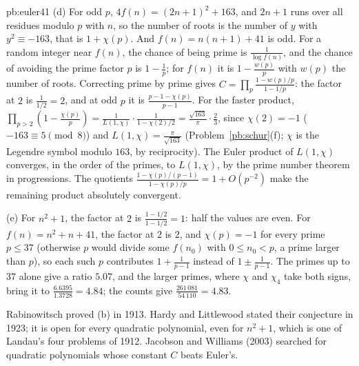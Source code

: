 \begin{solution}{pb:euler41}
(d) For odd $p$, $4f(n)=(2n+1)^2+163$, and $2n+1$ runs over all residues modulo $p$ with $n$, so the number of roots is the number of $y$ with $y^2\equiv-163$, that is $1+\chi(p)$. And
$f(n)=n(n+1)+41$ is odd. For a random integer near $f(n)$, the chance of being prime is $\frac1{\log f(n)}$, and the chance of avoiding the prime factor $p$ is $1-\frac1p$; for $f(n)$ it is
$1-\frac{w(p)}p$ with $w(p)$ the number of roots. Correcting prime by prime gives $C=\prod_p\frac{1-w(p)/p}{1-1/p}$: the factor at $2$ is $\frac1{1/2}=2$, and at odd $p$ it is
$\frac{p-1-\chi(p)}{p-1}$. For the faster product, $\prod_{p>2}(1-\frac{\chi(p)}p)=\frac{1}{L(1,\chi)}\cdot\frac1{1-\chi(2)/2}=\frac{\sqrt{163}}\pi\cdot\frac23$, since $\chi(2)=-1$ ($-163\equiv5\pmod8$) and
$L(1,\chi)=\frac\pi{\sqrt{163}}$ (Problem~\ref{pb:schur}(f); $\chi$ is the Legendre symbol modulo $163$, by reciprocity). The Euler product of $L(1,\chi)$ converges, in the order of the primes,
to $L(1,\chi)$, by the prime number theorem in progressions. The quotients $\frac{1-\chi(p)/(p-1)}{1-\chi(p)/p}=1+O(p^{-2})$ make the remaining product absolutely convergent.

(e) For $n^2+1$, the factor at $2$ is $\frac{1-1/2}{1-1/2}=1$: half the values are even. For $f(n)=n^2+n+41$, the factor at $2$ is $2$, and $\chi(p)=-1$ for every prime $p\le37$ (otherwise
$p$ would divide some $f(n_0)$ with $0\le n_0<p$, a prime larger than $p$), so each such $p$ contributes $1+\frac1{p-1}$ instead of $1\pm\frac1{p-1}$. The primes up to $37$ alone give
a ratio $5.07$, and the larger primes, where $\chi$ and $\chi_4$ take both signs, bring it to $\frac{6.6395}{1.3728}=4.84$; the counts give $\frac{261\,081}{54\,110}=4.83$.


\leads Rabinowitsch proved (b) in 1913. Hardy and Littlewood stated their conjecture in 1923; it is open for every quadratic polynomial, even for $n^2+1$, which is one of
Landau's four problems of 1912. Jacobson and Williams (2003) searched for quadratic polynomials whose constant $C$ beats Euler's.
\end{solution}


